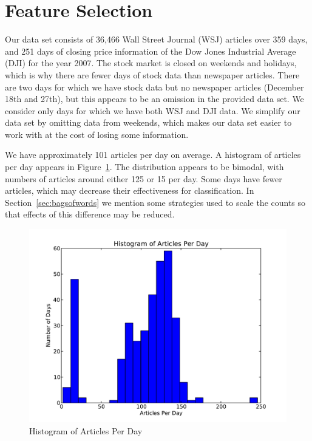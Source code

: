 \documentclass[10pt, twocolumn]{article}
\begin{document}


\section{Feature Selection}
\label{sec:features}

Our data set consists of 36,466 Wall Street Journal (WSJ) articles over 359 days, and 251 days of closing price information of the Dow Jones Industrial Average (DJI) for the year 2007. The stock market is closed on weekends and holidays, which is why there are fewer days of stock data than newspaper articles. There are two days for which we have stock data but no newspaper articles (December 18th and 27th), but this appears to be an omission in the provided data set. We consider only days for which we have both WSJ and DJI data. We simplify our data set by omitting data from weekends, which makes our data set easier to work with at the cost of losing some information.

We have approximately 101 articles per day on average. A histogram of articles per day appears in Figure~\ref{articlehist}. The distribution appears to be bimodal, with numbers of articles around either 125 or 15 per day. Some days have fewer articles, which may decrease their effectiveness for classification. In Section~\ref{sec:bagsofwords} we mention some strategies used to scale the counts so that effects of this difference may be reduced.

\begin{figure}
\centering
\includegraphics[scale=0.3]{text/articleshist.pdf}
\caption{Histogram of Articles Per Day}

\label{articlehist}
\end{figure}
\end{document}
